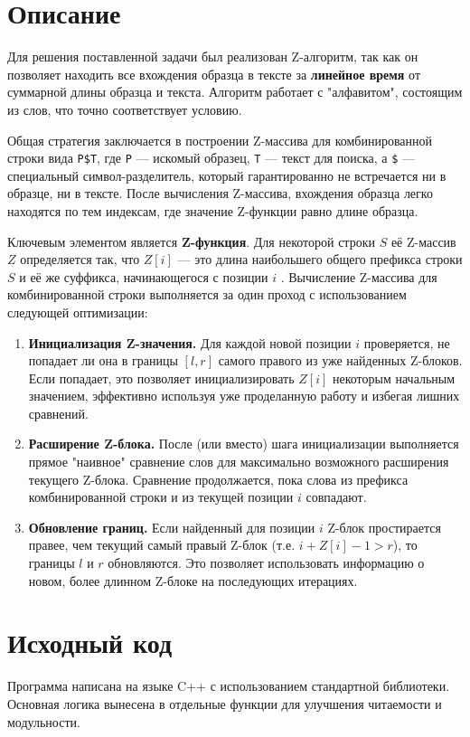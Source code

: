 \section{Описание}

Для решения поставленной задачи был реализован Z-алгоритм, так как он позволяет находить все вхождения образца в тексте за \textbf{линейное время} от суммарной длины образца и текста. Алгоритм работает с "алфавитом", состоящим из слов, что точно соответствует условию.

Общая стратегия заключается в построении Z-массива для комбинированной строки вида \texttt{P\$T}, где \texttt{P} — искомый образец, \texttt{T} — текст для поиска, а \texttt{\$} — специальный символ-разделитель, который гарантированно не встречается ни в образце, ни в тексте. После вычисления Z-массива, вхождения образца легко находятся по тем индексам, где значение Z-функции равно длине образца.

Ключевым элементом является \textbf{Z-функция}. Для некоторой строки $S$ её Z-массив $Z$ определяется так, что $Z[i]$ — это длина наибольшего общего префикса строки $S$ и её же суффикса, начинающегося с позиции $i$ \cite{Kormen}. Вычисление Z-массива для комбинированной строки выполняется за один проход с использованием следующей оптимизации:
\begin{enumerate}
    \item \textbf{Инициализация Z-значения.} Для каждой новой позиции $i$ проверяется, не попадает ли она в границы $[l, r]$ самого правого из уже найденных Z-блоков. Если попадает, это позволяет инициализировать $Z[i]$ некоторым начальным значением, эффективно используя уже проделанную работу и избегая лишних сравнений.
    \item \textbf{Расширение Z-блока.} После (или вместо) шага инициализации выполняется прямое "наивное" сравнение слов для максимально возможного расширения текущего Z-блока. Сравнение продолжается, пока слова из префикса комбинированной строки и из текущей позиции $i$ совпадают.
    \item \textbf{Обновление границ.} Если найденный для позиции $i$ Z-блок простирается правее, чем текущий самый правый Z-блок (т.е. $i + Z[i] - 1 > r$), то границы $l$ и $r$ обновляются. Это позволяет использовать информацию о новом, более длинном Z-блоке на последующих итерациях.
\end{enumerate}

\pagebreak

\section{Исходный код}
Программа написана на языке C++ с использованием стандартной библиотеки. Основная логика вынесена в отдельные функции для улучшения читаемости и модульности.

